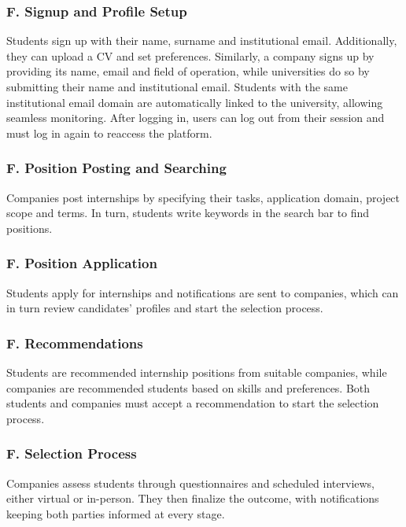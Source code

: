 \setcounter{f}{1}
\newcommand{\fc}{\thef{}}

\subsubsection*{F\fc. Signup and Profile Setup}
Students sign up with their name, surname and institutional email.
Additionally, they can upload a CV and set preferences.
Similarly, a company signs up by providing its name, email and field of operation, while universities do so by submitting their name and institutional email.
Students with the same institutional email domain are automatically linked to the university, allowing seamless monitoring.
After logging in, users can log out from their session and must log in again to reaccess the platform.

\subsubsection*{F\fc. Position Posting and Searching}
Companies post internships by specifying their tasks, application domain, project scope and terms.
In turn, students write keywords in the search bar to find positions.

\subsubsection*{F\fc. Position Application}
Students apply for internships and notifications are sent to companies, which can in turn review candidates’ profiles and start the selection process.

\subsubsection*{F\fc. Recommendations}
Students are recommended internship positions from suitable companies, while companies are recommended students based on skills and preferences.
Both students and companies must accept a recommendation to start the selection process.

\subsubsection*{F\fc. Selection Process}
Companies assess students through questionnaires and scheduled interviews, either virtual or in-person.
They then finalize the outcome, with notifications keeping both parties informed at every stage.

